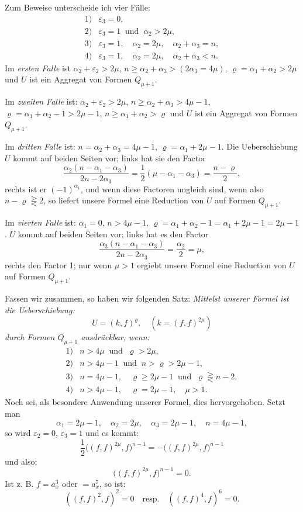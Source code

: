 \documentclass[10pt]{article}
\begin{document}
Zum Beweise unterscheide ich vier Fälle:
\[
\begin{array}{ll}
1) & \varepsilon_3=0,\\
2) & \varepsilon_3=1\ \text{ und }\ \alpha_2>2\mu,\\
3) & \varepsilon_3=1,\quad \alpha_2=2\mu,\quad \alpha_2+\alpha_3=n,\\
4) & \varepsilon_3=1,\quad \alpha_2=2\mu,\quad \alpha_2+\alpha_3<n.
\end{array}
\]
Im \emph{ersten Falle} ist $\alpha_2+\varepsilon_2>2\mu$, $n\geq \alpha_2+\alpha_3>(2\alpha_3=4\mu)$, $\varrho=\alpha_1+\alpha_2>2\mu$ und $U$ ist ein Aggregat von Formen $Q_{\mu+1}$.

Im \emph{zweiten Falle} ist: $\alpha_2+\varepsilon_2>2\mu$, $n\geq\alpha_2+\alpha_3>4\mu-1$, $\varrho=\alpha_1+\alpha_2-1>2\mu-1$, $n\geq\alpha_1+\alpha_2>\varrho$ und $U$ ist ein Aggregat von Formen $Q_{\mu+1}$.

Im \emph{dritten Falle} ist: $n=\alpha_2+\alpha_3=4\mu-1$, $\varrho=\alpha_1+2\mu-1$. Die Ueberschiebung $U$ kommt auf beiden Seiten vor; links hat sie den Factor
\[
\frac{\alpha_2(n-\alpha_1-\alpha_3)}{2n-2\alpha_3}=\frac12(\mu-\alpha_1-\alpha_3)=\frac{n-\varrho}{2},
\]
rechts ist er $(-1)^{\alpha_1}$, und wenn diese Factoren ungleich sind, wenn also $n-\varrho\gtreqless 2$, so liefert unsere Formel eine Reduction von $U$ auf Formen $Q_{\mu+1}$.

Im \emph{vierten Falle} ist: $\alpha_1=0$, $n>4\mu-1$, $\varrho=\alpha_1+\alpha_2-1=\alpha_1+2\mu-1=2\mu-1$. $U$ kommt auf beiden Seiten vor; links hat es den Factor
\[
\frac{\alpha_3(n-\alpha_1-\alpha_3)}{2n-2\alpha_3}=\frac{\alpha_2}{2}=\mu,
\]
rechts den Factor 1; nur wenn $\mu>1$ ergiebt unsere Formel eine Reduction von $U$ auf Formen $Q_{\mu+1}$.

Fassen wir zusammen, so haben wir folgenden Satz: \emph{Mittelst unserer Formel ist die Ueberschiebung:}
\[
U=(k,f)^\varrho,\quad (k=(f,f)^{2\mu})
\]
\emph{durch Formen $Q_{\mu+1}$ ausdrückbar, wenn:}
\[
\begin{array}{ll}
1) & n>4\mu\ \text{ und }\ \varrho>2\mu,\\
2) & n>4\mu-1\ \text{ und }\ n>\varrho>2\mu-1,\\
3) & n=4\mu-1,\quad \varrho\geq2\mu-1\ \text{ und }\ \varrho\gtreqless n-2,\\
4) & n>4\mu-1,\quad \varrho=2\mu-1,\quad \mu>1.
\end{array}
\]
Noch sei, als besondere Anwendung unserer Formel, dies hervorgehoben. Setzt man
\[
\alpha_1=2\mu-1,
\quad \alpha_2=2\mu,
\quad \alpha_3=2\mu-1,
\quad n=4\mu-1,
\]
so wird $\varepsilon_2=0$, $\varepsilon_3=1$ und es kommt:
\[
\frac12\bigl((f,f)^{2\mu},f\bigr)^{n-1}=-\bigl((f,f)^{2\mu},f\bigr)^{n-1}
\]
und also:
\[
\bigl((f,f)^{2\mu},f\bigr)^{n-1}=0.
\]
Ist z. B. $f=a_x^3$ oder $=a_x^7$, so ist:
\[
((f,f)^2,f)^2=0\quad\text{resp.}\quad ((f,f)^4,f)^6=0.
\]
\end{document}
